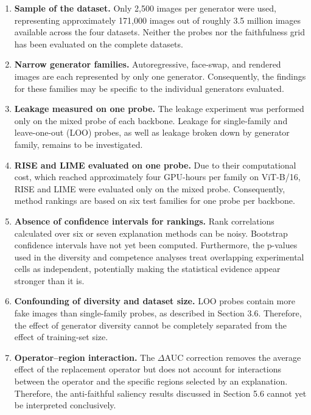 \begin{enumerate}
    \item \textbf{Sample of the dataset.}
    Only 2,500 images per generator were used, representing
    approximately 171,000 images out of roughly 3.5 million images
    available across the four datasets. Neither the probes nor the
    faithfulness grid has been evaluated on the complete datasets.

    \item \textbf{Narrow generator families.}
    Autoregressive, face-swap, and rendered images are each represented
    by only one generator. Consequently, the findings for these
    families may be specific to the individual generators evaluated.

    \item \textbf{Leakage measured on one probe.}
    The leakage experiment was performed only on the mixed probe of
    each backbone. Leakage for single-family and leave-one-out (LOO)
    probes, as well as leakage broken down by generator family, remains
    to be investigated.

    \item \textbf{RISE and LIME evaluated on one probe.}
    Due to their computational cost, which reached approximately four
    GPU-hours per family on ViT-B/16, RISE and LIME were evaluated only
    on the mixed probe. Consequently, method rankings are based on six
    test families for one probe per backbone.

    \item \textbf{Absence of confidence intervals for rankings.}
    Rank correlations calculated over six or seven explanation methods
    can be noisy. Bootstrap confidence intervals have not yet been
    computed. Furthermore, the p-values used in the diversity and
    competence analyses treat overlapping experimental cells as
    independent, potentially making the statistical evidence appear
    stronger than it is.

    \item \textbf{Confounding of diversity and dataset size.}
    LOO probes contain more fake images than single-family probes,
    as described in Section 3.6. Therefore, the effect of generator
    diversity cannot be completely separated from the effect of
    training-set size.

    \item \textbf{Operator--region interaction.}
    The $\Delta$AUC correction removes the average effect of the
    replacement operator but does not account for interactions between
    the operator and the specific regions selected by an explanation.
    Therefore, the anti-faithful saliency results discussed in
    Section 5.6 cannot yet be interpreted conclusively.


\end{enumerate}
